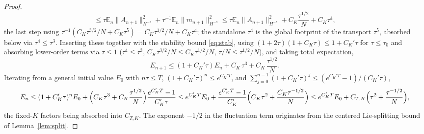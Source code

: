 \documentclass[a4paper,fleqn]{cas-sc}
\theoremstyle{definition}
\theoremstyle{remark}
\begin{document}
\begin{proof}
\[\le\tau\mathbb E_n\|A_{n+1}\|_{H^{-s}}^2+\tau^{-1}\mathbb E_n\|m_{n+1}\|_{H^{-s}}^2
\le\tau\mathbb E_n\|A_{n+1}\|_{H^{-s}}^2+C_K\frac{\tau^{1/2}}{N}+C_K\tau^4,
\]
the last step using $\tau^{-1}(C_K\tau^{3/2}/N+C_K\tau^5)=C_K\tau^{1/2}/N+C_K\tau^4$;
the standalone $\tau^4$ is the global footprint of the transport $\tau^5$, absorbed
below via $\tau^4\le\tau^3$.
Inserting these together with the stability bound \eqref{eq:stab}, using
$(1+2\tau)(1+C_K\tau)\le1+C_K'\tau$ for $\tau\le\tau_0$ and absorbing lower-order
terms via $\tau\le1$ ($\tau^4\le\tau^3$, $C_K\tau^{3/2}/N\le C_K\tau^{1/2}/N$,
$\tau/N\le\tau^{1/2}/N$), and taking total expectation,
\[
E_{n+1}\le(1+C_K'\tau)E_n+C_K\,\tau^3+C_K\,\frac{\tau^{1/2}}{N}.
\]
Iterating from a general initial value $E_0$ with $n\tau\le T$,
$(1+C_K'\tau)^n\le e^{C_K'T}$, and $\sum_{j=0}^{n-1}(1+C_K'\tau)^j
\le(e^{C_K'T}-1)/(C_K'\tau)$,
\[
E_n
\le(1+C_K'\tau)^nE_0+\Bigl(C_K\tau^3+C_K\frac{\tau^{1/2}}{N}\Bigr)\frac{e^{C_K'T}-1}{C_K'\tau}
\le e^{C_K'T}E_0+\frac{e^{C_K'T}-1}{C_K'}\Bigl(C_K\tau^2+\frac{C_K\tau^{-1/2}}{N}\Bigr)
\le e^{C_K'T}E_0+C_{T,K}\Bigl(\tau^2+\frac{\tau^{-1/2}}{N}\Bigr),
\]
the fixed-$K$ factors being absorbed into $C_{T,K}$. The exponent $-1/2$ in the
fluctuation term originates from the centered Lie-splitting bound of
Lemma~\ref{lem:split}.
\end{proof}
\end{document}
